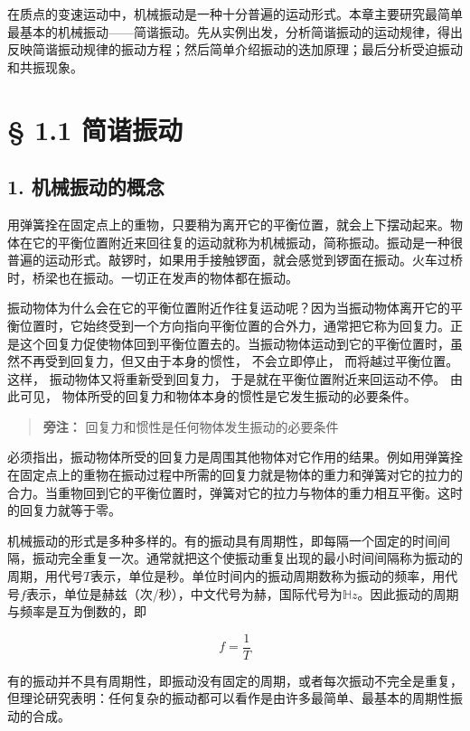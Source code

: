在质点的变速运动中，机械振动是一种十分普遍的运动形式。本章主要研究最简单最基本的机械振动------简谐振动。先从实例出发，分析简谐振动的运动规律，得出反映简谐振动规律的振动方程；然后简单介绍振动的迭加原理；最后分析受迫振动和共振现象。

\section{§ 1.1 简谐振动}\label{ux7b80ux8c10ux632fux52a8}

\subsection{1.
机械振动的概念}\label{ux673aux68b0ux632fux52a8ux7684ux6982ux5ff5}

用弹簧拴在固定点上的重物，只要稍为离开它的平衡位置，就会上下摆动起来。物体在它的平衡位置附近来回往复的运动就称为机械振动，简称振动。振动是一种很普遍的运动形式。敲锣时，如果用手接触锣面，就会感觉到锣面在振动。火车过桥时，桥梁也在振动。一切正在发声的物体都在振动。

振动物体为什么会在它的平衡位置附近作往复运动呢？因为当振动物体离开它的平衡位置时，它始终受到一个方向指向平衡位置的合外力，通常把它称为回复力。正是这个回复力促使物体回到平衡位置去的。当振动物体运动到它的平衡位置时，虽然不再受到回复力，但又由于本身的惯性，
不会立即停止， 而将越过平衡位置。 这样， 振动物体又将重新受到回复力，
于是就在平衡位置附近来回运动不停。 由此可见，
物体所受的回复力和物体本身的惯性是它发生振动的必要条件。

\begin{quote}
\textbf{旁注：} 回复力和惯性是任何物体发生振动的必要条件
\end{quote}

必须指出，振动物体所受的回复力是周围其他物体对它作用的结果。例如用弹簧拴在固定点上的重物在振动过程中所需的回复力就是物体的重力和弹簧对它的拉力的合力。当重物回到它的平衡位置时，弹簧对它的拉力与物体的重力相互平衡。这时的回复力就等于零。

机械振动的形式是多种多样的。有的振动具有周期性，即每隔一个固定的时间间隔，振动完全重复一次。通常就把这个使振动重复出现的最小时间间隔称为振动的周期，用代号\(T\)表示，单位是秒。单位时间内的振动周期数称为振动的频率，用代号\(f\)表示，单位是赫兹（次/秒），中文代号为赫，国际代号为\(\mathbb{H}z\)。因此振动的周期与频率是互为倒数的，即

\[
f = \frac{1}{T} \tag{1.1}
\]

有的振动并不具有周期性，即振动没有固定的周期，或者每次振动不完全是重复，但理论研究表明：任何复杂的振动都可以看作是由许多最简单、最基本的周期性振动的合成。

